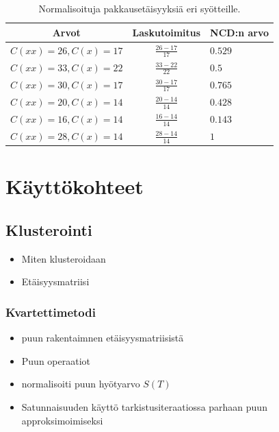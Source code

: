 \documentclass[12pt,finnish]{tktltiki2}
\theoremstyle{definition}
\theoremstyle{remark}
\begin{document}
  \begin{table}
    \centering
    \begin{tabular}{c|c|l}
      Arvot                    & Laskutoimitus      & NCD:n arvo \\ \hline
      $ C(xx) = 26, C(x) = 17$ & $\frac{26-17}{17} $ & $0.529$    \\ \hline
      $ C(xx) = 33, C(x) = 22$ & $\frac{33-22}{22} $ & $0.5$      \\ \hline
      $ C(xx) = 30, C(x) = 17$ & $\frac{30-17}{17} $ & $0.765$    \\ \hline
      $ C(xx) = 20, C(x) = 14$ & $\frac{20-14}{14} $ & $0.428$    \\ \hline
      $ C(xx) = 16, C(x) = 14$ & $\frac{16-14}{14} $ & $0.143$    \\ \hline
      $ C(xx) = 28, C(x) = 14$ & $\frac{28-14}{14} $ & $1$        \\
    \end{tabular}
    \caption{Normalisoituja pakkausetäisyyksiä eri syötteille.}
    \label{tab:NCD-values}
  \end{table}


\section{Käyttökohteet} %
\label{sec:k_ytt_kohteet}
  \subsection{Klusterointi} %
  \label{sub:klusterointi}
    \begin{itemize}
      \item Miten klusteroidaan
      \item Etäisyysmatriisi
    \end{itemize}
    \subsubsection{Kvartettimetodi} %
    \label{ssub:quartet_metodi}

    \begin{itemize}
      \item puun rakentaimnen etäisyysmatriisistä
      \item Puun operaatiot
      \item normalisoiti puun hyötyarvo $S(T)$
      \item Satunnaisuuden käyttö tarkistusiteraatiossa parhaan puun approksimoimiseksi
    \end{itemize}
\end{document}
